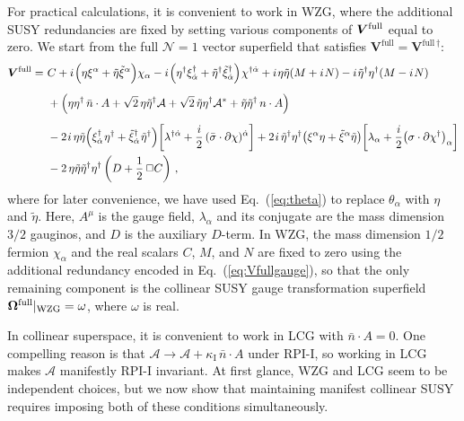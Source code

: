 \documentclass[12pt,document,nofootinbib,superscriptaddress,onecolumn,preprintnumbers,balancelastpage]{article}
\newcommand{\rpii}{{\kappa_\text{I}}}
\newcommand{\full}{\text{full}}
\newcommand{\s}{\hspace{0.8pt}}
\DeclareRobustCommand{\Eq}[1]{Eq.~(\ref{#1})}
\newcommand{\bV}{ \boldsymbol V}
\newcommand{\RCA}{\boldsymbol{\Omega}}
\newcommand{\alc}{\mathcal{A}}
\begin{document}
\begin{spacing}{1.2}
For practical calculations, it is convenient to work in WZG, where the additional SUSY redundancies are fixed by setting various components of $\bV^{\rm full}$ equal to zero.
%
We start from the full $\mathcal{N} = 1$ vector superfield that satisfies $\bV^{\full} = \bV^{\full\, \dagger}$:  
% 
\begin{align}
 \bV^{\text{full}} =\,\,& C + i\s \Big(\eta \xi^\alpha + \tilde{\eta} \tilde{\xi}^\alpha\Big)\chi_\alpha - i\s \Big(\eta^\dagger \xi^{\dagger}_{\dot{\alpha}} + \tilde{\eta}^\dagger \tilde{\xi}^\dagger_{\dot{\alpha}}\Big)\s \chi^{\dagger \dot{\alpha}} + i\s \eta \tilde{\eta}(M + i\s N) - i\s \tilde{\eta}^\dagger \eta^\dagger (M - i\s N)\nonumber \\[5pt] 
&+  \left(\eta \eta^\dagger\, \bar{n}\cdot A + \sqrt{2} \, \eta \tilde{\eta}^\dagger \alc + \sqrt{2}\, \tilde{\eta} \eta^\dagger \alc^* + \tilde{\eta} \tilde{\eta}^\dagger\, n \cdot A  \right)  \nonumber\\[5pt] 
&- 2\s i\,  \eta \tilde{\eta}\Big(\xi^{\dagger}_{\dot{\alpha}}\s \eta^\dagger + \tilde{\xi}^{\dagger}_{\dot{\alpha}}\s \tilde{\eta}^\dagger\Big)\! \left[ \lambda^{\dagger \dot{\alpha}} + \frac{i}{2}\, (\bar{\sigma} \cdot \partial \chi)^{\dot{\alpha}}   \right]+2\s i\,  \tilde{\eta}^\dagger \eta^\dagger  \big(\xi^\alpha \eta + \tilde{\xi}^\alpha \tilde{\eta}\big)\! \left[  \lambda_\alpha + \frac{i}{2} \big(\sigma \cdot \partial \chi^\dagger\big)_\alpha \right]\notag\\
& - 2\,  \eta \tilde{\eta} \tilde{\eta}^\dagger \eta^\dagger \left( D + \frac{1}{2}\, \Box C \right)\,, 
\label{eq:VfullNotWZ}
\end{align}
where for later convenience, we have used  \Eq{eq:theta} to replace $\theta_\alpha$ with $\eta$ and $\tilde{\eta}$. 
%
Here, $A^\mu$ is the gauge field, $\lambda_\alpha$ and its conjugate are the mass dimension $3/2$ gauginos, and $D$ is the auxiliary $D$-term.
%
In WZG, the mass dimension $1/2$ fermion $\chi_\alpha$ and the real scalars $C$, $M$, and $N$ are fixed to zero using the additional redundancy encoded in \Eq{eq:Vfullgauge}, so that the only remaining component is the collinear SUSY gauge transformation superfield $\RCA^{\rm full}|_{\rm WZG} = \omega$, where $\omega$ is real. 


In collinear superspace, it is convenient to work in LCG with $\bar{n} \cdot A = 0$.
%
One compelling reason is that $\alc \to \alc + \rpii \, \bar{n}\cdot A$ under RPI-I, so working in LCG makes $\alc$ manifestly RPI-I invariant.
%
At first glance, WZG and LCG seem to be independent choices, but we now show that maintaining manifest collinear SUSY requires imposing both of these conditions simultaneously.



\end{spacing}
\end{document}
